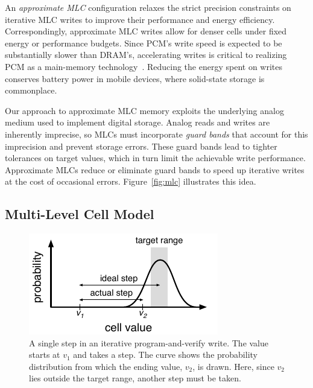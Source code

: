 \documentclass[prodmode,acmtocs]{acmsmall}
\begin{document}
An \emph{approximate MLC} configuration relaxes the strict precision
constraints on iterative MLC writes to improve their performance and energy
efficiency. Correspondingly, approximate MLC writes allow for denser cells
under fixed energy or performance budgets. Since PCM's write speed is expected
to be substantially slower than DRAM's, accelerating writes is critical to
realizing PCM as a main-memory technology~\cite{pcm-dram-alt}.
Reducing the energy
spent on writes conserves battery power in mobile devices, where
solid-state storage is commonplace.

Our approach to approximate MLC memory exploits the underlying
analog medium used to implement digital storage. Analog reads and
writes are inherently imprecise, so MLCs must incorporate \emph{guard
bands} that account for this imprecision and prevent storage errors.
These guard bands lead to tighter tolerances on target values, which in turn limit
the achievable write performance.
Approximate MLCs reduce or eliminate guard bands to speed up
iterative writes at the cost of occasional errors.
Figure~\ref{fig:mlc} illustrates this idea.

\subsection{Multi-Level Cell Model}
\label{sec:mlcmodel}

\begin{figure}
    \centering
    \includegraphics[scale=0.9]{figs/mlc-step}
    \caption{
        A single step in an iterative program-and-verify write. The value
        starts at $v_1$ and takes a step. The curve shows the probability
        distribution from which the ending value, $v_2$, is drawn. Here, since
        $v_2$ lies outside the target range, another step must be taken.
    }
    \label{fig:mlc-step}
\end{figure}
\end{document}

